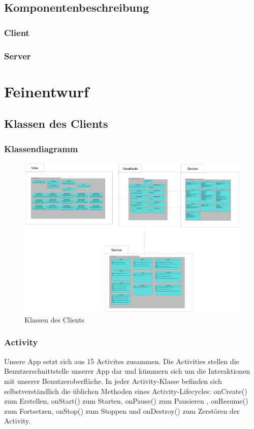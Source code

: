 \documentclass[a4paper]{scrreprt}
\begin{document}
	 \section{Komponentenbeschreibung}
		 \subsection{Client}
	 		
		
		 \subsection{Server}
	 	 	
	 	 
        
\newpage

\chapter{Feinentwurf}
	\section{Klassen des Clients}
	\subsection{Klassendiagramm}
	\begin{figure}[H]
	       \centering
	       \includegraphics[scale = .07]{all_client_packages.png}
	       \caption{Klassen des Clients}
	      \end{figure}
	
	
	 \subsection{Activity} 
Unsere App setzt sich aus 15 Activites zusammen. Die Activities stellen die Benutzerschnittstelle unserer App dar und kümmern sich um die Interaktionen mit unserer Benutzeroberfläche. In jeder Activity-Klasse befinden sich selbstverständlich die üblichen Methoden eines Activity-Lifecycles: onCreate() zum Erstellen, onStart() zum Starten, onPause() zum Pausieren , onResume() zum Fortsetzen, onStop() zum Stoppen und onDestroy() zum Zerstören der Activity.
	
	    
\end{document}
